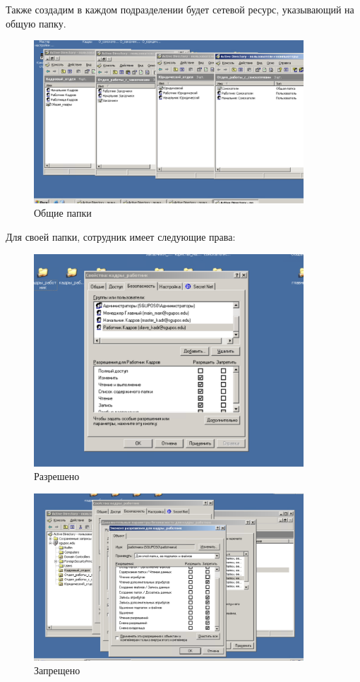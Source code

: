 Также создадим в каждом подразделении будет сетевой ресурс, указывающий на общую папку.
\begin{figure}[H]
  \centering
  \includegraphics[width=0.9\textwidth]{pict/prac/7}
  \caption{Общие папки}
  \label{fig:18}
\end{figure}

Для своей папки, сотрудник имеет следующие права:
\begin{figure}[H]
  \centering
  \includegraphics[width=0.9\textwidth]{pict/prac/8}
  \caption{Разрешено}
  \label{fig:20}
\end{figure}


\begin{figure}[H]
  \centering
  \includegraphics[width=0.9\textwidth]{pict/prac/61}
  \caption{Запрещено}
\end{figure}


